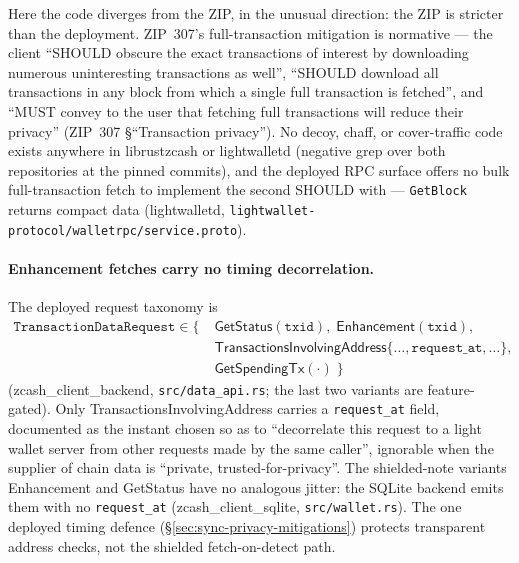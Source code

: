 \documentclass[11pt,a4paper]{article}
\theoremstyle{definition}
\begin{document}
Here the code diverges from the ZIP, in the unusual direction: the ZIP is
stricter than the deployment. ZIP~307's full-transaction mitigation is
normative --- the client ``SHOULD obscure the exact transactions of
interest by downloading numerous uninteresting transactions as well'',
``SHOULD download all transactions in any block from which a single full
transaction is fetched'', and ``MUST convey to the user that fetching full
transactions will reduce their privacy''
(ZIP~307 \S``Transaction privacy''). No decoy, chaff, or cover-traffic code
exists anywhere in \textsf{librustzcash} or \textsf{lightwalletd} (negative
grep over both repositories at the pinned commits), and the deployed RPC
surface offers no bulk full-transaction fetch to implement the second
SHOULD with --- \texttt{GetBlock} returns compact data
(\textsf{lightwalletd}, \texttt{lightwallet-protocol/walletrpc/service.proto}).

\paragraph{Enhancement fetches carry no timing decorrelation.} The deployed
request taxonomy is
\begin{align*}
\texttt{TransactionDataRequest} \in \{\;
  &\textsf{GetStatus}(\texttt{txid}),\;
   \textsf{Enhancement}(\texttt{txid}),\\
  &\textsf{TransactionsInvolvingAddress}\{\ldots,
   \texttt{request\_at}, \ldots\},\\
  &\textsf{GetSpendingTx}(\cdot)\;\}
\end{align*}
(\textsf{zcash\_client\_backend}, \texttt{src/data\_api.rs}; the last two
variants are feature-gated). Only \textsf{TransactionsInvolvingAddress}
carries a \texttt{request\_at} field, documented as the instant chosen so
as to ``decorrelate this request to a light wallet server from other
requests made by the same caller'', ignorable when the supplier of chain
data is ``private, trusted-for-privacy''. The shielded-note variants
\textsf{Enhancement} and \textsf{GetStatus} have no analogous jitter: the
SQLite backend emits them with no \texttt{request\_at}
(\textsf{zcash\_client\_sqlite}, \texttt{src/wallet.rs}). The one deployed
timing defence (\S\ref{sec:sync-privacy-mitigations}) protects transparent
address checks, not the shielded fetch-on-detect path.
\end{document}
